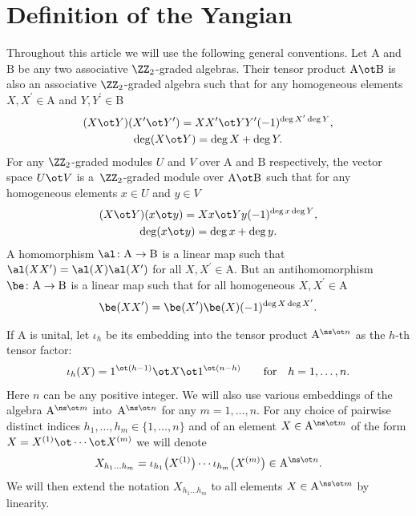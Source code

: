 \section{Definition of the Yangian}\label{sec:1}

Throughout this article we will use the following general conventions.
Let $\mathrm{A}$ and $\mathrm{B}$ be any two associative
$\ZZ_{2}$-graded algebras. Their tensor product
$\mathrm{A}\ot\mathrm{B}$ is also
an associative $\ZZ_2$-graded algebra such that for any homogeneous
elements
$X,X^\prime\in\mathrm{A}$ and $Y,Y^\prime\in\mathrm{B}$
\begin{gather}\label{conv1}
(X\ot Y) (X^\prime\ot Y^\prime)=X X^\prime\ot Y Y^\prime (-1)^{\deg X^\prime\deg Y},\\
\label{conv2}
\deg (X\ot Y)=\deg X+\deg Y .
\end{gather}
For any $\ZZ_2$-graded modules
$U$ and $V$ over $\mathrm{A}$ and $\mathrm{B}$ respectively,
the vector space $U\ot V$ is a~$\ZZ_2$-graded module over
$\mathrm{A}\ot\mathrm{B}$ such that for any homogeneous elements
$x\in U$ and $y\in V$
\begin{gather}\label{XY}
(X\ot Y) ( x\ot y ) =X x\ot Y y (-1)^{\deg x \deg Y},\\
\label{xy}
\deg ( x\ot y )=\deg x+\deg y .
\end{gather}
A homomorphism $\al\colon \mathrm{A}\to\mathrm{B}$ is a linear map
such that $\al (X X^\prime)=\al (X) \al (X^\prime)$ for all
$X,X^\prime\in\mathrm{A} $. But an antihomomorphism
$\be\colon \mathrm{A}\to\mathrm{B}$ is a linear map
such that for all homogeneous $X,X^\prime\in\mathrm{A}$
\begin{gather}\label{bb}
\be (X X^\prime )=\be (X^\prime) \be (X) (-1)^{\deg X\deg X^\prime}.
\end{gather}

If $\mathrm{A}$ is unital,
let $\iota_{h}$ be
its embedding into the tensor product $\mathrm{A}^{\ns\ot n}$
as the $h $-th tensor factor:
\begin{gather*}
\iota_{h}(X)=1^{\ot (h-1)}\ot X\ot1^{\ot (n-h)}\qquad\text{for}\quad h=1,\dots, n .
\end{gather*}
Here $n$ can be any positive integer.
We will also use various embeddings of the algebra
$\mathrm{A}^{\ns\ot m}$ into~$\mathrm{A}^{\ns\ot n}$
for any $m=1,\dots, n$.
For any choice of pairwise distinct indices $h_1,\dots, h_m\in\{1,\dots, n \}$
and of an element $X\in\mathrm{A}^{\ns\ot m}$ of the form
$X=X^{(1)}\ot\cdots\ot X^{(m)}$ we will denote
\begin{gather*}
X_{h_1\dots h_m}=\iota_{h_1}\big(X^{(1)}\big) \cdots \iota_{h_m}\big(X^{(m)}\big) \in\mathrm{A}^{\ns\ot n}.
\end{gather*}
We will then extend the notation $X_{h_1\dots h_m}$ to all elements
$X\in\mathrm{A}^{\ns\ot m}$ by linearity.

